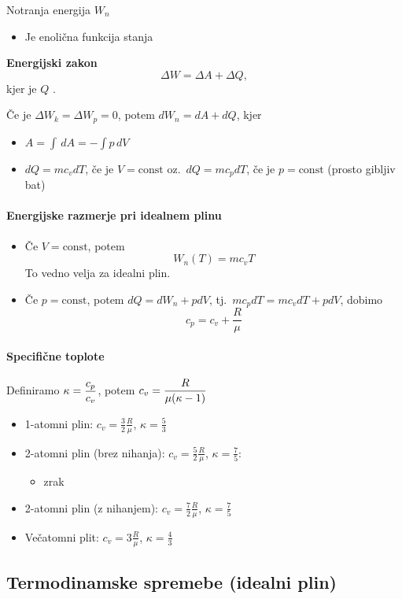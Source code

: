 Notranja energija \(W_n\)
\begin{itemize}
    \item Je enolična funkcija stanja
\end{itemize}
\textbf{Energijski zakon}
\[\Delta W = \Delta A + \Delta Q,\]
kjer je \(Q\) .

Če je \(\Delta W_k = \Delta W_p = 0\), potem \(dW_n = dA + dQ\), kjer
\begin{itemize}
    \item \(A = \int \, dA = - \int p \, dV\)
    \item \(dQ = mc_v dT\), če je \(V = \text{const}\) oz.\ \(dQ = mc_p dT\), če je \(p = \text{const}\) (prosto gibljiv bat)
\end{itemize}
\newpage
\paragraph{Energijske razmerje pri idealnem plinu}
\begin{itemize}
    \item Če \(V = \text{const}\), potem \[W_n(T) = mc_v T\]
    To vedno velja za idealni plin.
    \item Če \(p = \text{const}\), potem \(dQ = dW_n + pdV\), tj.\ \(mc_pdT = mc_vdT + pdV\), dobimo \[c_p = c_v + \frac{R}{\mu}\]
\end{itemize}
\paragraph{Specifične toplote}
Definiramo \(\displaystyle \kappa = \frac{c_p}{c_v}\), potem \(\displaystyle c_v = \frac{R}{\mu (\kappa - 1)}\)
\begin{itemize}
    \item 1-atomni plin: \(c_v = \frac{3}{2} \frac{R}{\mu}\), \(\kappa = \frac{5}{3}\)
    \item 2-atomni plin (brez nihanja): \(c_v = \frac{5}{2} \frac{R}{\mu}\), \(\kappa = \frac{7}{5}\): 
    \begin{itemize}
        \item zrak
    \end{itemize}
    \item 2-atomni plin (z nihanjem): \(c_v = \frac{7}{2} \frac{R}{\mu}\), \(\kappa = \frac{7}{5}\) 
    \item Večatomni plit: \(c_v = 3 \frac{R}{\mu}\), \(\kappa = \frac{4}{3}\)
\end{itemize}

\subsection{Termodinamske spremebe (idealni plin)}

